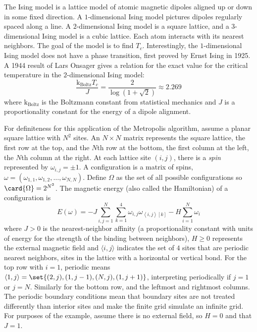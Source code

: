 \documentclass[12pt]{article}
\begin{document}
The Ising model is a lattice model of atomic magnetic dipoles aligned up
or down in some fixed direction.  A \( 1 \)-dimensional Ising model
pictures dipoles regularly spaced along a line.  A \( 2 \)-dimensional
Ising model is a square lattice, and a \( 3 \)-dimensional Ising model
is a cubic lattice.  Each atom interacts with its nearest neighbors. The
goal of the model is to find \( T_c \).  Interestingly, the \( 1 \)-dimensional
Ising model does not have a phase transition, first proved by Ernst
Ising in 1925.  A 1944 result of Lars Onsager gives a relation for the
exact value for the critical temperature in the \( 2 \)-dimensional
Ising model:
\[
    \frac{\text{k}_{\text{Boltz}} T_c}{J} = \frac{2}{\log(1 + \sqrt{2})}
    \approx 2.269
\] where \( \text{k}_{\text{Boltz}} \) is the Boltzmann constant from
statistical mechanics and \( J \) is a proportionality constant for the
energy of a dipole alignment.

For definiteness for this application of the Metropolis algorithm,
assume a planar square lattice with \( N^2 \) sites.  An \( N \times N \)
matrix represents the square lattice, the first row at the top, and the \(
N \)th row at the bottom, the first column at the left, the \( N \)th
column at the right.  At each lattice site \( (i,j) \), there is a \emph
{spin} represented by \( \omega_{i,j} = \pm 1 \).  A configuration is a
matrix of spins, \( \omega = (\omega_ {1,1}, \omega_{1,2}, \dots, \omega_
{N,N}) \).%
Define \( \Omega \) as the set of all possible configurations so \(
\card{\Omega} = 2^{N^2} \).  The magnetic energy (also called the
Hamiltonian) of a configuration is
\[
    E(\omega) = -J \sum\limits_{i, j=1}^{N} \sum\limits_{k=1}^4 \omega_{i,
    j} \omega_{\left\langle i,j \right\rangle[k]} - H \sum\limits_{i=1}^N
    \omega_i
\] where \( J > 0 \) is the nearest-neighbor affinity (a proportionality
constant with units of energy for the strength of the binding between
neighbors), \( H \ge 0 \) represents the external magnetic field and \(
\langle i, j \rangle \) indicates the set of \( 4 \) sites that are
periodic nearest neighbors, sites in the lattice with a horizontal or
vertical bond.  For the top row with \( i = 1 \), periodic means \(
\left\langle 1, j \right\rangle = \set{(2,j), (1, j-1), (N,j), (1, j+1)}
\), interpreting periodically if \( j=1 \) or \( j=N \).  Similarly for
the bottom row, and the leftmost and rightmost columns.  The periodic
boundary conditions mean that boundary sites are not treated differently
than interior sites and make the finite grid simulate an infinite grid.
For purposes of the example, assume there is no external field, so \(
H=0 \) and that \( J=1 \).
\end{document}
